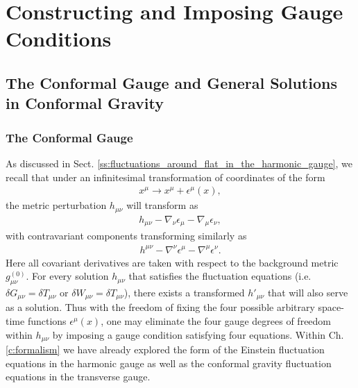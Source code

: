 
\chapter{Constructing and Imposing Gauge Conditions}
\label{c:constructing_gauge_conditions}


\section{The Conformal Gauge and General Solutions in Conformal Gravity}
\label{s:conformal_gauge_sols}

\subsection{The Conformal Gauge}
\label{ss:conformal_gauge}
As discussed in Sect. \ref{ss:fluctuations_around_flat_in_the_harmonic_gauge}, we recall that under an infinitesimal transformation of coordinates of the form
%
\begin{eqnarray}
x^{\mu}\rightarrow x^{\mu}+\epsilon^{\mu}(x),
\label{liecoord}
\end{eqnarray}
%
the metric perturbation $h_{\mu\nu}$ will transform as
%
\begin{eqnarray}
h_{\mu\nu}-\nabla_{\nu}\epsilon_{\mu}-\nabla_{\mu}\epsilon_{\nu},
\label{covarh}
\end{eqnarray}
%
with contravariant components transforming similarly as
%
\begin{eqnarray}
h^{\mu\nu}-\nabla^{\nu}\epsilon^{\mu}-\nabla^{\mu}\epsilon^{\nu}.
\label{contrah}
\end{eqnarray}
%
Here all covariant derivatives are taken with respect to the background metric $g_{\mu\nu}^{(0)}$. For every solution $h_{\mu\nu}$ that satisfies the fluctuation equations (i.e. $\delta G_{\mu\nu} = \delta T_{\mu\nu}$ or $\delta W_{\mu\nu} = \delta T_{\mu\nu}$), there exists a transformed $h'_{\mu\nu}$ that will also serve as a solution. Thus with the freedom of fixing the four possible arbitrary space-time functions $\epsilon^\mu(x)$, one may eliminate the four gauge degrees of freedom within $h_{\mu\nu}$ by imposing a gauge condition satisfying four equations. Within Ch. \ref{c:formalism} we have already explored the form of the Einstein fluctuation equations in the harmonic gauge as well as the conformal gravity fluctuation equations in the transverse gauge.

